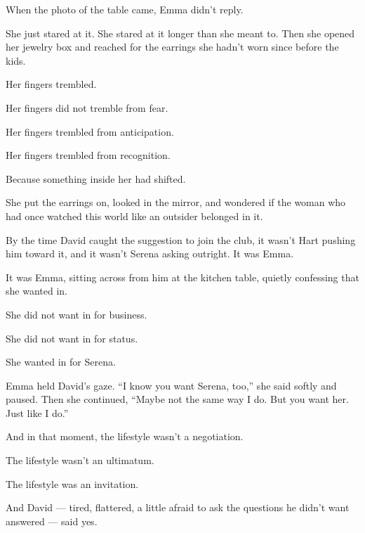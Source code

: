 When the photo of the table came, Emma didn’t reply.

She just stared at it. She stared at it longer than she meant to.
Then she opened her jewelry box and reached for the earrings she hadn’t worn since before the kids.

Her fingers trembled.

Her fingers did not tremble from fear.  

Her fingers trembled from anticipation.

Her fingers trembled from recognition.

Because something inside her had shifted.

She put the earrings on, looked in the mirror, and wondered if the woman who had once watched this world 
like an outsider belonged in it.


By the time David caught the suggestion to join the club, it wasn’t Hart pushing him toward it, and it wasn’t Serena asking 
outright. It was Emma.  

It was Emma, sitting across from him at the kitchen table, quietly confessing that she wanted in.  

She did not want in for business.  

She did not want in for status.  

She wanted in for Serena.

Emma held David's gaze.  ``I know you want Serena, too,'' she said softly and paused.  
Then she continued, ``Maybe not the same way I do. But you want her. Just like I do.''

And in that moment, the lifestyle wasn’t a negotiation.  

The lifestyle wasn’t an ultimatum.  

The lifestyle was an invitation.

And David --- tired, flattered, a little afraid to ask the questions he didn’t want answered ---  
said yes.

\medskip

